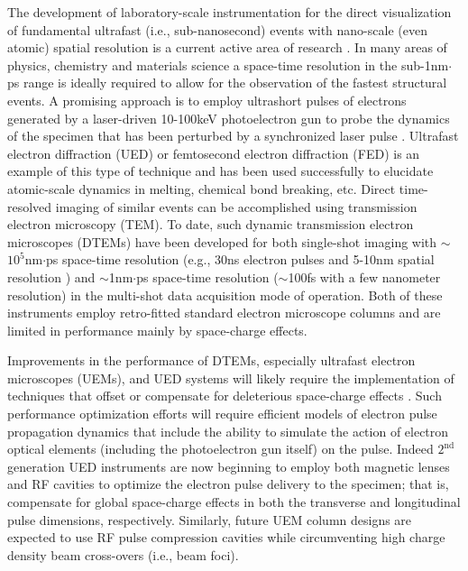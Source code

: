 The development of laboratory-scale instrumentation for the direct visualization of fundamental ultrafast (i.e., sub-nanosecond) events with nano-scale (even atomic) spatial resolution is a current active area of research \cite{king_ultrafast_2005}.
In many areas of physics, chemistry and materials science a space-time resolution in the sub-1nm$\cdot$ps range is ideally required to allow for the observation of the fastest structural events.
A promising approach is to employ ultrashort pulses of electrons generated by a laser-driven 10-100keV photoelectron gun to probe the dynamics of the specimen that has been perturbed by a synchronized laser pulse \cite{king_ultrafast_2005}.
Ultrafast electron diffraction (UED) or femtosecond electron diffraction (FED) \cite{srinivasan_ultrafast_2003,williamson_clocking_1997,cao_femtosecond_2003} is an example of this type of technique and has been used successfully to elucidate atomic-scale dynamics in melting,\cite{cao_femtosecond_2003,sciaini_electronic_2009,siwick_atomic-level_2003} chemical bond breaking,\cite{zewail_laser_1988} etc.
Direct time-resolved imaging of similar events can be accomplished using transmission electron microscopy (TEM).
To date, such dynamic transmission electron microscopes (DTEMs) \cite{bostanjoglo_tracing_1980,domer_high-speed_2003} have been developed for both single-shot imaging with $\sim$$10^{5}$nm$\cdot$ps space-time resolution (e.g., 30ns electron pulses and 5-10nm spatial resolution \cite{lagrange_single-shot_2006,armstrong_practical_2007}) and $\sim$1nm$\cdot$ps space-time resolution ($\sim$100fs with a few nanometer resolution\cite{park_direct_2009}) in the multi-shot data acquisition mode of operation.
Both of these instruments employ retro-fitted standard electron microscope columns and are limited in performance mainly by space-charge effects.

Improvements in the performance of DTEMs, especially ultrafast electron microscopes (UEMs), and UED systems will likely require the implementation of techniques that offset or compensate for deleterious space-charge effects \cite{armstrong_prospects_2007,lobastov_four-dimensional_2005}.
Such performance optimization efforts will require efficient models of electron pulse propagation dynamics that include the ability to simulate the action of electron optical elements (including the photoelectron gun itself) on the pulse.
Indeed $2^{\text{nd}}$ generation UED instruments are now beginning to employ both magnetic lenses and RF cavities \cite{oudheusden_electron_2007,veisz_hybrid_2007} to optimize the electron pulse delivery to the specimen; that is, compensate for global space-charge effects in both the transverse and longitudinal pulse dimensions, respectively.
Similarly, future UEM column designs are expected to use RF pulse compression cavities while circumventing high charge density beam cross-overs (i.e., beam foci).

